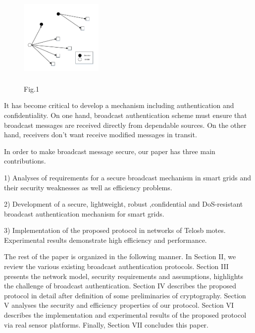 \documentclass[10pt, conference, compsocconf]{IEEEtran}
\begin{document}
\begin{figure}
\centering
\includegraphics[width=4cm,height=4cm]{fig_1.pdf}\\
\caption{Fig.1}\label{} 
\end{figure}
It has become critical to develop a mechanism including authentication and confidentiality.
On one hand,  broadcast authentication scheme must ensure that broadcast messages are received directly from dependable sources. On the other hand, receivers don't want receive   modified messages in transit.

In order to make broadcast message secure, our paper has three main contributions.

1) Analyses of requirements for a secure broadcast mechanism in smart grids and their security weaknesses as well as efficiency problems.

2) Development of a secure, lightweight, robust ,confidential and DoS-resistant broadcast authentication mechanism for smart grids. 

3) Implementation of the proposed protocol in networks of Telosb motes. Experimental results demonstrate high efficiency and performance.

The rest of the paper is organized in the following manner. In Section II, we review the various existing broadcast authentication protocols. Section III presents the network model, security requirements and assumptions, highlights the challenge of broadcast authentication. Section IV describes the proposed protocol in detail after definition of some preliminaries of cryptography. Section V analyses the security and efficiency properties of our protocol. Section VI describes the implementation and experimental results of the proposed protocol via real sensor platforms. Finally, Section VII concludes this paper.
\end{document}
